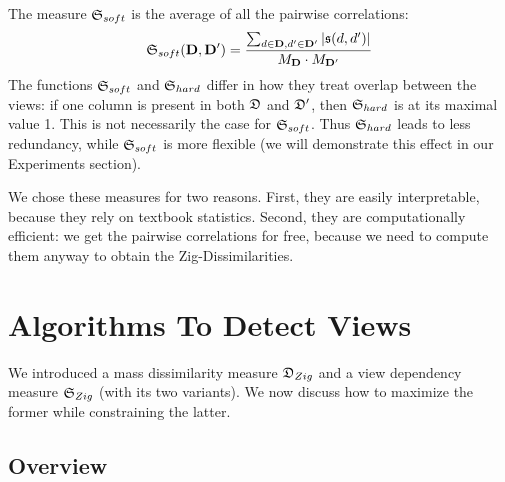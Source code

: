 The measure  $\mathfrak{S}_{soft}$ is the average of all the pairwise
correlations:
\begin{gather}
    \mf{S}_{soft}(\rb{D}, \rb{D'}) = 
    \frac{\sum_{d \in \rb{D}, d' \in \rb{D'}} |\mf{s}(d, d')|}
        {M_\rb{D} \cdot M_{\rb{D}'}}
\end{gather}
The functions $\mathfrak{S}_{soft}$ and $\mathfrak{S}_{hard}$ differ in how they treat
overlap between the views: if one column is present in both $\mathfrak{D}$ and
$\mathfrak{D}'$, then $\mathfrak{S}_{hard}$ is at its maximal value 1. This is not
necessarily the case for $\mathfrak{S}_{soft}$. Thus $\mathfrak{S}_{hard}$ leads to less
redundancy, while $\mathfrak{S}_{soft}$ is more flexible (we will demonstrate this
effect in our Experiments section).

We chose these measures for two reasons. First, they are easily interpretable,
because they rely on textbook statistics.  Second, they are computationally
efficient: we get the pairwise correlations for free, because we need to
compute them anyway to obtain the Zig-Dissimilarities. 



\section{Algorithms To Detect Views}
\label{sec:algorithm}

We introduced a mass dissimilarity measure $\mathfrak{D}_{Zig}$ and a view dependency
measure $\mathfrak{S}_{Zig}$ (with its two variants). We now discuss how to maximize
the former while constraining the latter.

\subsection{Overview}
\label{sec:overview}

